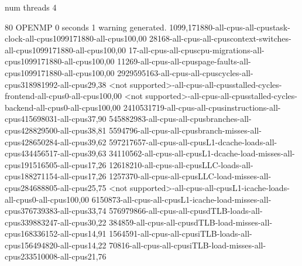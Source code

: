 num threads 4

80
OPENMP
0 seconds
1 warning generated.
1099,171880-all-cpus-all-cpustask-clock-all-cpus1099171880-all-cpus100,00
28168-all-cpus-all-cpuscontext-switches-all-cpus1099171880-all-cpus100,00
17-all-cpus-all-cpuscpu-migrations-all-cpus1099171880-all-cpus100,00
11269-all-cpus-all-cpuspage-faults-all-cpus1099171880-all-cpus100,00
2929595163-all-cpus-all-cpuscycles-all-cpus318981992-all-cpus29,38
<not supported>-all-cpus-all-cpusstalled-cycles-frontend-all-cpus0-all-cpus100,00
<not supported>-all-cpus-all-cpusstalled-cycles-backend-all-cpus0-all-cpus100,00
2410531719-all-cpus-all-cpusinstructions-all-cpus415698031-all-cpus37,90
545882983-all-cpus-all-cpusbranches-all-cpus428829500-all-cpus38,81
5594796-all-cpus-all-cpusbranch-misses-all-cpus428650284-all-cpus39,62
597217657-all-cpus-all-cpusL1-dcache-loads-all-cpus434456517-all-cpus39,63
34110562-all-cpus-all-cpusL1-dcache-load-misses-all-cpus191516505-all-cpus17,26
12618210-all-cpus-all-cpusLLC-loads-all-cpus188271154-all-cpus17,26
1257370-all-cpus-all-cpusLLC-load-misses-all-cpus284688805-all-cpus25,75
<not supported>-all-cpus-all-cpusL1-icache-loads-all-cpus0-all-cpus100,00
6150873-all-cpus-all-cpusL1-icache-load-misses-all-cpus376739383-all-cpus33,74
576979866-all-cpus-all-cpusdTLB-loads-all-cpus339883247-all-cpus30,22
384859-all-cpus-all-cpusdTLB-load-misses-all-cpus168336152-all-cpus14,91
1564591-all-cpus-all-cpusiTLB-loads-all-cpus156494820-all-cpus14,22
70816-all-cpus-all-cpusiTLB-load-misses-all-cpus233510008-all-cpus21,76
